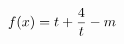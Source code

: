 \documentclass[preview]{standalone}
\begin{document}
\begin{align*}
\special{dvisvgm:raw <g id='unique000'>}f(x)=t+\frac{4}{t}-m\special{dvisvgm:raw </g>}
\end{align*}
\end{document}
